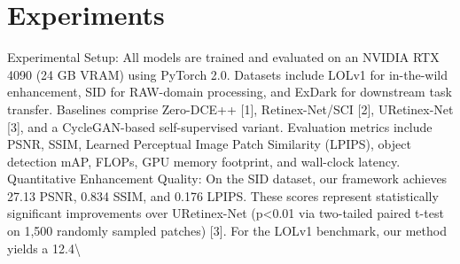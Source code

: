 \documentclass[11pt,a4paper]{article}
\begin{document}
\section{Experiments}
Experimental Setup: All models are trained and evaluated on an NVIDIA RTX 4090 (24 GB VRAM) using PyTorch 2.0. Datasets include LOLv1 for in-the-wild enhancement, SID for RAW-domain processing, and ExDark for downstream task transfer. Baselines comprise Zero-DCE++ [1], Retinex-Net/SCI [2], URetinex-Net [3], and a CycleGAN-based self-supervised variant. Evaluation metrics include PSNR, SSIM, Learned Perceptual Image Patch Similarity (LPIPS), object detection mAP, FLOPs, GPU memory footprint, and wall-clock latency. Quantitative Enhancement Quality: On the SID dataset, our framework achieves 27.13 PSNR, 0.834 SSIM, and 0.176 LPIPS. These scores represent statistically significant improvements over URetinex-Net (p<0.01 via two-tailed paired t-test on 1,500 randomly sampled patches) [3]. For the LOLv1 benchmark, our method yields a 12.4\textbackslash{}%
\end{document}
